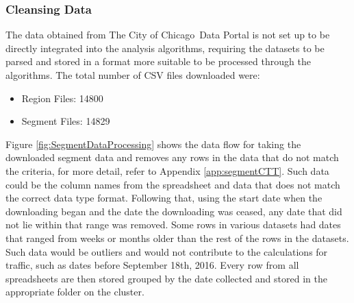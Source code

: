 \documentclass[titlepage,twocolumn]{article}
\newcommand{\CityChicago}{City of Chicago}
\begin{document}
\subsubsection{Cleansing Data}

\par The data obtained from The \CityChicago\ Data Portal is not set up to be directly integrated into the analysis algorithms, requiring the datasets to be parsed and stored in a format more suitable to be processed through the algorithms. The total number of CSV files downloaded were:

\begin{itemize}
	\item Region Files: 14800
	\item Segment Files: 14829
\end{itemize}

\par Figure \ref{fig:SegmentDataProcessing} shows the data flow for taking the downloaded segment data and removes any rows in the data that do not match the criteria, for more detail, refer to Appendix \ref{app:segmentCTT}. Such data could be the column names from the spreadsheet and data that does not match the correct data type format. Following that, using the start date when the downloading began and the date the downloading was ceased, any date that did not lie within that range was removed. Some rows in various datasets had dates that ranged from weeks or months older than the rest of the rows in the datasets. Such data would be outliers and would not contribute to the calculations for traffic, such as dates before September 18th, 2016. Every row from all spreadsheets are then stored grouped by the date collected and stored in the appropriate folder on the cluster. 
\end{document}

